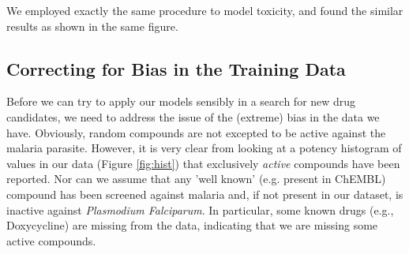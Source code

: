 \documentclass[journal=jacsat,manuscript=article]{achemso}
\begin{document}
We  employed exactly the same procedure to model toxicity, and found the similar results as shown in the same figure.


\subsection*{Correcting for Bias in the Training Data}

Before we can try to apply our models sensibly in a search for  new drug candidates, we need to address the issue of the (extreme) bias in the data we have.  Obviously, random compounds are not excepted to be active against the malaria parasite.  However, it is very clear from looking at a potency histogram of values in our data (Figure \ref{fig:hist}) that %
exclusively \textit{active} compounds have been reported.  Nor can we assume that any 'well known' (e.g. present in ChEMBL) compound has been screened against malaria and, if not present in our dataset, is inactive against \textit{Plasmodium Falciparum}.  In particular, some known drugs (e.g., Doxycycline) are missing from the data, indicating that we are missing some active compounds.
\end{document}
